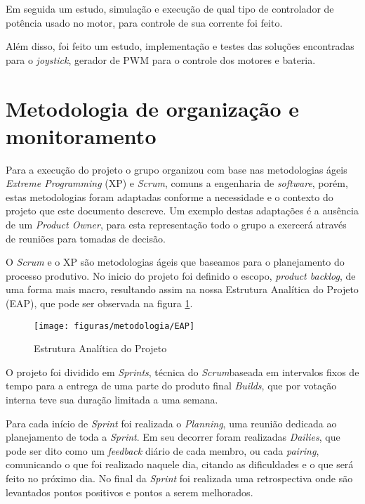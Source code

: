 	Em seguida um estudo, simulação e execução de qual tipo de controlador de potência  usado no motor, para controle de sua corrente foi feito.

	Além disso, foi feito um estudo, implementação e testes das soluções encontradas para o \textit{joystick}, gerador de PWM para o controle dos motores e bateria.

\section{Metodologia de organização e monitoramento}

Para a execução do projeto o grupo organizou com base nas metodologias ágeis \textit{Extreme Programming} (XP) e \textit{Scrum}, comuns a engenharia de \textit{software}, porém, estas metodologias foram adaptadas conforme a necessidade e o contexto do projeto que este documento descreve. Um exemplo destas adaptações é a ausência de um \textit{Product Owner}, para esta representação todo o grupo a exercerá através de reuniões para tomadas de decisão.

O \textit{Scrum} e o XP são metodologias ágeis que  baseamos para o planejamento do processo produtivo. No inicio do projeto foi definido o escopo, \textit{product backlog}, de uma forma mais macro, resultando assim na nossa  Estrutura Analítica do Projeto (EAP), que pode ser observada na figura \ref{fig:eap}.

\begin{figure}[!htb]
\centering
  \texttt{[image: figuras/metodologia/EAP]}
\caption{Estrutura Analítica do Projeto}
\label{fig:eap}
\end{figure}

O projeto foi dividido em \textit{Sprints}, técnica do\textit{ Scrum}baseada em intervalos fixos de tempo para a entrega de uma parte do produto final \textit{Builds}, que por votação interna teve sua duração limitada a uma semana.

Para cada início de \textit{Sprint} foi realizada o \textit{Planning}, uma reunião dedicada ao planejamento de toda a \textit{Sprint}. Em seu decorrer foram realizadas \textit{Dailies}, que pode ser dito como um \textit{feedback} diário de cada membro, ou cada \textit{pairing}, comunicando o que foi realizado naquele dia, citando as dificuldades e o que será feito no próximo dia. No final da \textit{Sprint} foi realizada uma retrospectiva onde são levantados pontos positivos e pontos a serem melhorados.

